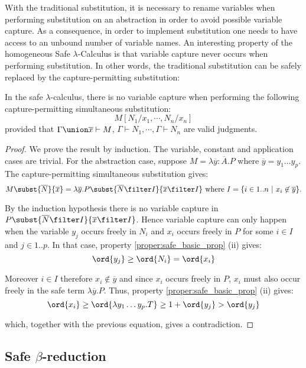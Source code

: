 With the traditional substitution, it is necessary to rename
variables when performing substitution on an abstraction in order to
avoid possible variable capture. As a consequence, in order to
implement substitution one needs to have access to an unbound number
of variable names. An interesting property of the homogeneous Safe
$\lambda$-Calculus is that variable capture never occurs when
performing substitution. In other words, the traditional
substitution can be safely replaced by the capture-permitting
substitution:

\begin{lemma}
\label{lem:homog_nocapture} In the safe $\lambda$-calculus, there is
no variable capture when performing the following capture-permitting
simultaneous substitution:
$$ M[N_1 / x_1 , \cdots, N_n / x_n] $$
provided that $\Gamma \union \overline{x} \vdash M$, $\Gamma \vdash  N_1, \cdots ,\Gamma \vdash  N_n$ are valid judgments.
\end{lemma}

\begin{proof}
We prove the result by induction. The variable, constant and
application cases are trivial. For the abstraction case, suppose $M
= \lambda \overline{y} : \overline{A}. P$ where $\overline{y} = y_1
\ldots y_p$. The capture-permitting simultaneous substitution gives:
$$M \subst{\overline{N}}{\overline{x}} = \lambda \overline{y} . P
\subst{\overline{N} \filter I}{\overline{x} \filter
I} \mbox{ where } I  = \{ i \in 1..n \ | \ x_i \not \in \overline{y}
\}. $$


By the induction hypothesis there is no variable capture in $P
\subst{\overline{N} \filter I}{\overline{x} \filter
I}$. Hence variable capture can only happen when the variable $y_j$
occurs freely in $N_i$ and $x_i$ occurs freely in $P$ for some $i
\in I$ and $j \in 1..p$. In that case, property
\ref{proper:safe_basic_prop} (ii) gives:
$$ \ord{y_j} \geq \ord{N_i} = \ord{x_i}$$

Moreover $i\in I$ therefore $x_i \not \in \overline{y}$ and since $x_i$ occurs freely in $P$, $x_i$ must also occur freely in the safe term
$\lambda \overline{y}. P$. Thus, property \ref{proper:safe_basic_prop} (ii) gives:
$$ \ord{x_i} \geq \ord{\lambda y_1 \ldots y_p . T} \geq 1+ \ord{y_j} > \ord{y_j}$$

which, together with the previous equation, gives a contradiction.
\end{proof}




\subsection{Safe $\beta$-reduction}

